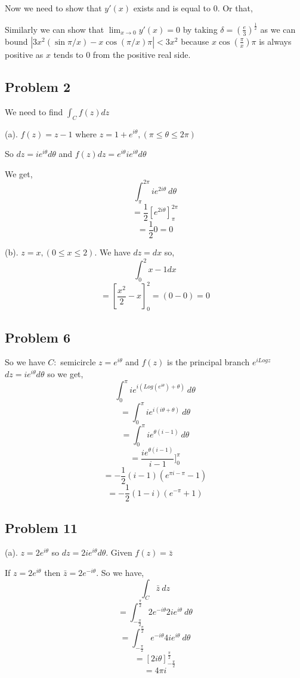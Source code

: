 \documentclass[a4paper]{report}
\begin{document}
Now we need to show that  $y'(x)$ exists and is equal to 0. Or that, 

Similarly we can show that $\lim_{x \to 0} y'(x) = 0$  by taking $\delta = (\frac{e}{3})^{\frac{1}{2}}$ as we can bound $|3x^2(\sin \pi /x) - x \cos(\pi / x)\pi| < 3x^2$ because $x\cos(\frac{\pi}{ x}) \pi$ is always positive as $x$ tends to 0 from the positive real side.



\subsection*{Problem 2}
We need to find $\int_C f(z) dz$

(a). $f(z) = z - 1$ where  $z = 1 + e^{i\theta}, (\pi \le \theta \le 2\pi)$

So $dz = ie^{i\theta} d\theta$ and $f(z) dz = e^{i\theta} ie^{i\theta}d\theta$ 

We get, 
$$ \int_{{\pi}}^{{2\pi}} {ie^{2i\theta}} \: d{\theta} {} $$ 
$$= \frac{1}{2}[e^{2i\theta}]_{\pi}^{2\pi} $$ 
$$ = \frac{1}{2}0 = 0 $$ 


(b). $z = x, (0 \le x \le 2)$. We have $dz = dx$ so,  
$$ \int_0^2 x - 1 dx $$ 
$$  = [\frac{x^2}{2} - x]_0^2 =  (0 - 0) = 0$$ 


\subsection*{Problem 6}
So we have $C: $ semicircle $z = e^{i\theta}$ and $f(z)$ is the principal branch $e^{i Log z}$ 
$dz = ie^{i\theta}d\theta$ so we get, 
$$ \int_{{0}}^{{\pi}} {ie^{i(Log (e^{i\theta}) + \theta)}} \: d{\theta} {} $$ 
$$ = \int_{{0}}^{{\pi}} {ie^{i(i\theta + \theta)}} \: d{\theta} {} $$ 
$$ = \int_{{0}}^{{\pi}} {ie^{\theta(i -1)}} \: d{\theta} {} $$ 
$$ = \frac{ie^{\theta(i -1)}}{i-1}]_0^\pi$$ 
$$ =-\frac{1}{2} (i - 1) (e^{\pi i - \pi} - 1) $$ 
$$  = -\frac{1}{2} (1 - i) (e^{-\pi} + 1) $$ 

\subsection*{Problem 11}
(a). $z = 2e^{i\theta}$ so $dz = 2ie^{i\theta}d\theta$. Given $f(z) = \bar z$

If  $z = 2e^{i\theta}$ then $\bar z = 2e^{-i\theta}$. So we have, 
$$ \int_{{C}}^{{}} {\bar z} \: d{z} {} $$ 
$$ = \int_{{-\frac{\pi}{2}}}^{{\frac{\pi}{2}}} {2e^{-i\theta}2ie^{i\theta}} \: d{\theta} {} $$ 
$$ = \int_{{-\frac{\pi}{2}}}^{{\frac{\pi}{2}}} {e^{-i\theta}4ie^{i\theta}} \: d{\theta} {} $$ 
$$ =[ 2i\theta]_{-\frac{\pi}{2}}^{\frac{\pi}{2}} $$ 
$$ = 4\pi i $$ 
\end{document}

